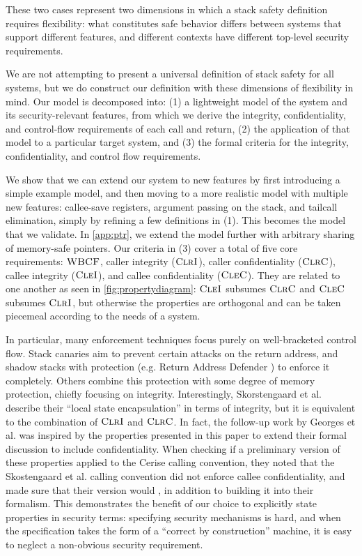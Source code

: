 \documentclass[10pt,conference]{ieeetran}%
\theoremstyle{definition}
\begin{document}
These two cases represent two dimensions in which a stack safety definition requires
flexibility: what constitutes safe behavior differs between systems that support different
features, and different contexts have different top-level security requirements.

We are not attempting to present a universal definition of stack safety for all systems,
but we do construct our definition with these dimensions of flexibility in mind.
Our model is decomposed into:
(1) a lightweight model of the system and its security-relevant features, from which we
derive the integrity, confidentiality, and control-flow requirements of each call and
return, (2) the application of that model to a particular target system, and (3)
the formal criteria for the integrity, confidentiality, and control flow
requirements.

We show that we can extend our system to new features by first introducing a simple
example model, and then moving to a more realistic model with multiple new features:
callee-save registers, argument passing on the stack, and tailcall elimination, simply
by refining a few definitions in (1). This becomes the model that we validate.
In \cref{app:ptr}, we extend the model further with arbitrary sharing of memory-safe
pointers. Our criteria in (3) cover a total of five core requirements:
\(\textnormal{\sc WBCF}\), caller integrity (\(\textnormal{\sc ClrI}\)), caller confidentiality (\(\textnormal{\sc ClrC}\)),
callee integrity (\(\textnormal{\sc CleI}\)), and callee confidentiality (\(\textnormal{\sc CleC}\)).
They are related to one another as seen in
\cref{fig:propertydiagram}: \(\textnormal{\sc CleI}\) subsumes \(\textnormal{\sc ClrC}\) and \(\textnormal{\sc CleC}\) subsumes
\(\textnormal{\sc ClrI}\), but otherwise the properties are orthogonal and can be taken piecemeal
according to the needs of a system.

In particular, many enforcement techniques focus purely on
well-bracketed control flow. Stack canaries aim to prevent certain attacks on the return
address, and shadow stacks with protection (e.g. Return Address Defender \cite{Chiueh2001RAD})
to enforce it completely. Others combine this protection with some degree of memory protection,
chiefly focusing on integrity. Interestingly, Skorstengaard et al. \cite{SkorstengaardSTKJFP}
describe their ``local state encapsulation'' in terms of integrity, but it is equivalent
to the combination of \(\textnormal{\sc ClrI}\) and \(\textnormal{\sc ClrC}\). In fact, the follow-up work by 
Georges et al. \cite{Georges22:TempsDesCerises} was inspired by the properties presented in this paper to extend their formal discussion to include confidentiality.
When checking if a preliminary version of these properties applied to
the Cerise calling convention, they noted that the Skostengaard et al. calling convention
did not enforce callee confidentiality, and made sure that their version would
\cite{Georges22:personalcommunication}, in addition to building it into their formalism.
This demonstrates the benefit of our choice to explicitly state properties in security
terms: specifying security mechanisms is hard, and when the specification takes the
form of a ``correct by construction'' machine, it is easy to neglect a non-obvious
security requirement.
\end{document}
